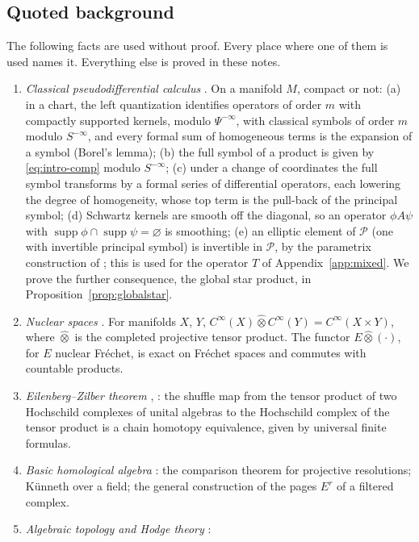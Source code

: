 \documentclass[11pt,oneside,reqno]{article}
\DeclareMathOperator{\supp}{supp}
\newcommand{\cP}{\mathcal P}
\newcommand{\CI}{C^\infty}
\newcommand{\hot}{\mathbin{\widehat\otimes}}
\theoremstyle{plain}
\theoremstyle{definition}
\theoremstyle{remark}
\begin{document}
\subsection{Quoted background}\label{subsec:quoted}
The following facts are used without proof. Every place where one of them
is used names it. Everything else is proved in these notes.
\begin{enumerate}
\item[(G1)] \emph{Classical pseudodifferential calculus}
\cite{LoyaAS,Hormander3,MelroseMicro}. On a manifold \(M\), compact or not:
(a) in a chart, the left quantization identifies operators of order \(m\)
with compactly supported kernels, modulo \(\Psi^{-\infty}\), with
classical symbols of order \(m\) modulo \(S^{-\infty}\), and every formal
sum of homogeneous terms is the expansion of a symbol (Borel's lemma);
(b) the full symbol of a product is given by \eqref{eq:intro-comp} modulo
\(S^{-\infty}\); (c) under a change of coordinates the full symbol
transforms by a formal series of differential operators, each lowering
the degree of homogeneity, whose top term is the pull-back of the
principal symbol; (d) Schwartz kernels are smooth off the diagonal, so
an operator \(\phi A\psi\) with \(\supp\phi\cap\supp\psi=\varnothing\) is
smoothing; (e) an elliptic element of \(\cP\) (one with invertible principal
symbol) is invertible in \(\cP\), by the parametrix construction of
\cite[\S``Pseudodifferential parametrices'']{LoyaAS}; this is used for the operator
\(T\) of Appendix~\ref{app:mixed}. We prove the further consequence, the global
star product, in Proposition~\ref{prop:globalstar}.
\item[(G2)] \emph{Nuclear spaces} \cite[Chs.~43, 50, 51]{Treves}. For
manifolds \(X\), \(Y\), \(\CI(X)\hot\CI(Y)=\CI(X\times Y)\), where \(\hot\) is
the completed projective tensor product. The functor \(E\hot(\cdot)\), for
\(E\) nuclear Fréchet, is exact on Fréchet spaces and commutes with
countable products.
\item[(G3)] \emph{Eilenberg--Zilber theorem} \cite[\S4.2]{Loday},
\cite[\S8.5]{Weibel}: the shuffle map from the tensor product of two
Hochschild complexes of unital algebras to the Hochschild complex of the
tensor product is a chain homotopy equivalence, given by universal finite
formulas.
\item[(G4)] \emph{Basic homological algebra} \cite[Chs.~2, 3, 5]{Weibel}: the
comparison theorem for projective resolutions; Künneth over a field;
the general construction of the pages \(E^r\) of a filtered complex.
\item[(G5)] \emph{Algebraic topology and Hodge theory} \cite{BottTu,LoyaAS}:

\end{enumerate}
\end{document}
